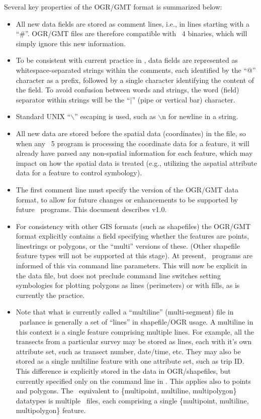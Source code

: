 Several key properties of the OGR/GMT format is summarized below:

\begin{itemize}
\item All new data fields are stored as comment lines, i.e., in lines starting
with a ``\#''.  OGR/GMT files are therefore compatible with \GMT\ 4 binaries,
which will simply ignore this new information.

\item  To be consistent with current practice in \GMT, data fields are
represented as whitespace-separated strings within the comments, each
identified by the ``@'' character as
a prefix, followed by a single character identifying the content of the
field. To avoid confusion between words and strings, the word (field)
separator within strings will be the ``$|$'' (pipe or vertical bar) character.

\item  Standard UNIX ``$\backslash$'' escaping is used, such as $\backslash$n
for newline in a string.

\item All new data are stored before the spatial data (coordinates) in the
file, so when any \GMT\ 5 program is processing the coordinate data for a
feature, it will already have parsed any non-spatial information for
each feature, which may impact on how the spatial data is treated
(e.g., utilizing the aspatial attribute data for a feature to control
symbology).

\item The first comment line must specify the version of the
OGR/GMT data format, to allow for future changes or enhancements to be
supported by future \GMT\ programs. This document describes v1.0.

\item For consistency with other GIS formats (such as shapefiles) the
OGR/GMT format explicitly contains a field specifying whether the features
are points, linestrings or polygons, or the ``multi'' versions of these.
(Other shapefile feature types will not be supported at this stage). At
present, \GMT\ programs are informed of this via command line parameters.
This will now be explicit in the data file, but does not preclude
command line switches setting symbologies for plotting polygons as
lines (perimeters) or with fills, as is currently the practice.

\item Note that what is currently called a
``multiline'' (multi-segment) file in \GMT\ parlance
is generally a set of ``lines'' in
shapefile/OGR usage. A multiline in this context is a single feature
comprising multiple lines.
For example, all the transects from a particular survey may be stored as
lines, each with it's own attribute set, such as
transect number, date/time, etc. They may also be stored as a single
multiline feature with one attribute set, such as trip ID. This
difference is explicitly stored in the data in OGR/shapefiles, but
currently specified only on the command line in \GMT. This applies also
to points and polygons. The \GMT\ equivalent to
\{multipoint, multiline, multipolygon\} datatypes is multiple \GMT\ files, each
comprising a single \{multipoint, multiline, multipolygon\} feature. 


\end{itemize}
